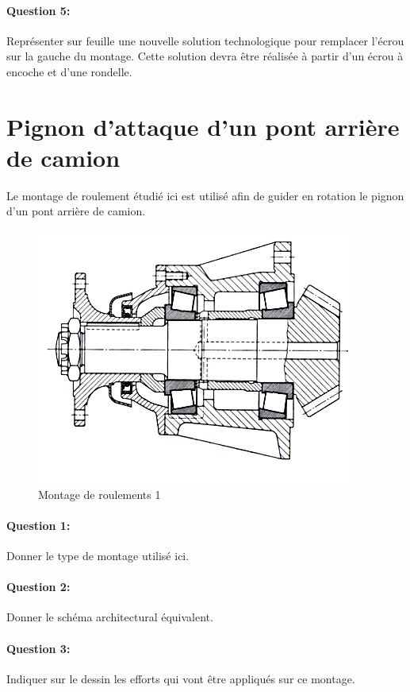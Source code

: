\paragraph{Question 5:} Représenter sur feuille une nouvelle solution technologique pour remplacer l'écrou sur la gauche du montage. Cette solution devra être réalisée à partir d'un écrou à encoche et d'une rondelle.

\newpage

\section{Pignon d'attaque d'un pont arrière de camion}

Le montage de roulement étudié ici est utilisé afin de guider en rotation le pignon d'un pont arrière de camion.

\begin{figure}[!h]
	\begin{center}
	\includegraphics[width=0.6\linewidth]{img/Picture2}
		\caption{Montage de roulements 1}
		\label{fig:image1}
	\end{center}
\end{figure}

\paragraph{Question 1:} Donner le type de montage utilisé ici.

\paragraph{Question 2:} Donner le schéma architectural équivalent.

\paragraph{Question 3:} Indiquer sur le dessin les efforts qui vont être appliqués sur ce montage.

